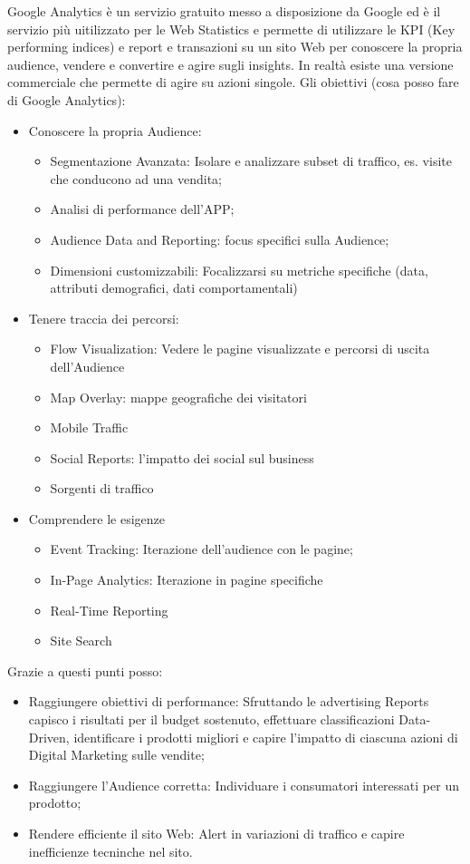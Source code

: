 \documentclass[11pt]{article}
\newenvironment{nosepitemize}{\begin{itemize}[noitemsep,topsep=0ex]}{\end{itemize}}
\begin{document}
Google Analytics è un servizio gratuito messo a disposizione da Google ed è il servizio più uitilizzato per le Web Statistics e permette di utilizzare le KPI (Key performing indices) e report e transazioni su un sito Web per conoscere la propria audience, vendere e convertire e agire sugli insights. In realtà esiste una versione commerciale che permette di agire su azioni singole.
\newline
Gli obiettivi (cosa posso fare di Google Analytics):
\begin{nosepitemize}
	\item Conoscere la propria Audience:
	\begin{nosepitemize}
		\item Segmentazione Avanzata: Isolare e analizzare subset di traffico, es. visite che conducono ad una vendita;
		\item Analisi di performance dell'APP;
		\item Audience Data and Reporting: focus specifici sulla Audience;
		\item Dimensioni customizzabili: Focalizzarsi su metriche specifiche (data, attributi demografici, dati comportamentali)
	\end{nosepitemize}
	\item Tenere traccia dei percorsi:
	\begin{nosepitemize}
		\item Flow Visualization: Vedere le pagine visualizzate e percorsi di uscita dell'Audience
		\item Map Overlay: mappe geografiche dei visitatori
		\item Mobile Traffic
		\item Social Reports: l'impatto dei social sul business
		\item Sorgenti di traffico
	\end{nosepitemize}
	\item Comprendere le esigenze
	\begin{nosepitemize}
		\item Event Tracking: Iterazione dell'audience con le pagine;
		\item In-Page Analytics: Iterazione in pagine specifiche
		\item Real-Time Reporting
		\item Site Search
	\end{nosepitemize}
\end{nosepitemize}

Grazie a questi punti posso:
\begin{nosepitemize}
	\item Raggiungere obiettivi di performance: Sfruttando le advertising Reports capisco i risultati per il budget sostenuto, effettuare classificazioni Data-Driven, identificare i prodotti migliori e capire l'impatto di ciascuna azioni di Digital Marketing sulle vendite;
	\item Raggiungere l'Audience corretta: Individuare i consumatori interessati per un prodotto;
	\item Rendere efficiente il sito Web: Alert in variazioni di traffico e capire inefficienze tecninche nel sito.
\end{nosepitemize}
\end{document}

